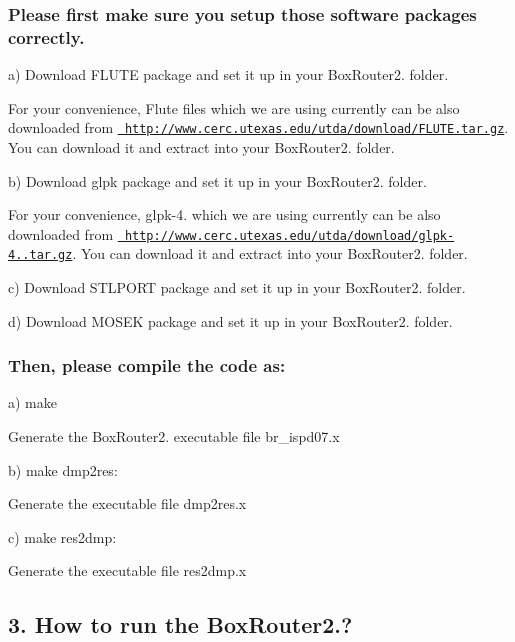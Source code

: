 \subsubsection*{Please first make sure you setup those software packages correctly.}


\begin{DoxyItemize}
\item a) Download F\+L\+U\+TE package and set it up in your Box\+Router2. folder.

For your convenience, Flute files which we are using currently can be also downloaded from \href{http://www.cerc.utexas.edu/utda/download/FLUTE.tar.gz}{\texttt{ http\+://www.\+cerc.\+utexas.\+edu/utda/download/\+F\+L\+U\+T\+E.\+tar.\+gz}}. You can download it and extract into your Box\+Router2. folder.
\item b) Download glpk package and set it up in your Box\+Router2. folder.

For your convenience, glpk-\/4. which we are using currently can be also downloaded from \href{http://www.cerc.utexas.edu/utda/download/glpk-4.10.tar.gz}{\texttt{ http\+://www.\+cerc.\+utexas.\+edu/utda/download/glpk-\/4..\+tar.\+gz}}. You can download it and extract into your Box\+Router2. folder.
\item c) Download S\+T\+L\+P\+O\+RT package and set it up in your Box\+Router2. folder.
\item d) Download M\+O\+S\+EK package and set it up in your Box\+Router2. folder.
\end{DoxyItemize}

\subsubsection*{Then, please compile the code as\+:}


\begin{DoxyItemize}
\item a) make

Generate the Box\+Router2. executable file br\+\_\+ispd07.\+x
\item b) make dmp2res\+:

Generate the executable file dmp2res.\+x
\item c) make res2dmp\+:

Generate the executable file res2dmp.\+x
\end{DoxyItemize}

\subsection*{3. How to run the Box\+Router2.?}

